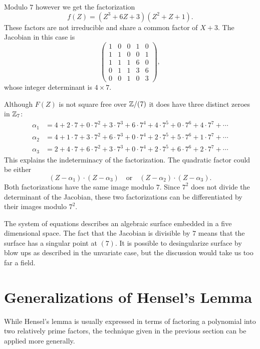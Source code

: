 {Modulo $7$ however we get the factorization
\[
f(Z) = (Z^3 + 6 Z + 3) (Z^2 +  Z + 1).
\]
These factors are not irreducible and share a common factor of
$X+3$.  The Jacobian in this case is 
\[
\left(
\begin{array}{ccccc}
1 & 0 & 0 & 1 & 0 \\
1 & 1 & 0 & 0 & 1 \\
1 & 1 & 1 & 6 & 0 \\
0 & 1 & 1 & 3 & 6 \\
0 & 0 & 1 & 0 & 3
\end{array}
\right),
\]
whose integer determinant is $4 \times 7$.

\label{PolyZ7:SQFR:Ex}
Although $F(Z)$ is not square free over $\mathbb{Z}/(7)$ it does have three
distinct zeroes in $\mathbb{Z}_7$:
\[
\begin{aligned}
\alpha_1 & = 4 + 2\cdot 7 + 0\cdot 7^2 + 3\cdot 7^3 + 6\cdot 7^4 +
4\cdot 7^5 + 0\cdot 7^6 + 4\cdot 7^7 + \cdots \\
\alpha_2 & = 4 + 1\cdot7 + 3\cdot7^2 + 6\cdot7^3 + 0\cdot7^4 + 2\cdot7^5
+ 5\cdot7^6 + 1\cdot7^7 + \cdots \\
\alpha_3 & = 2 + 4\cdot7 + 6\cdot7^2 + 3\cdot7^3 + 0\cdot7^4 +
2\cdot7^5 + 6\cdot7^6 + 2\cdot7^7 + \cdots
\end{aligned}
\]
This explains the indeterminacy of the factorization.  The quadratic
factor could be either
\[
(Z - \alpha_1) \cdot (Z - \alpha_3) \quad\mbox{or}\quad
(Z - \alpha_2) \cdot (Z - \alpha_3).
\]
Both factorizations have the same image modulo $7$.  Since $7^2$ does
not divide the determinant of the Jacobian, these two factorizations
can be differentiated by their images modulo $7^2$.

The system of equations  describes an
algebraic surface embedded in a five dimensional space.  The fact that
the Jacobian is divisible by $7$ means that the surface has a singular
point at $(7)$.  It is possible to desingularize surface by blow ups
as described in the unvariate case,  but the discussion would take us too far a field.


\section{Generalizations of Hensel's Lemma}
\label{General:Hensel:Sec}

While Hensel's lemma is usually expressed in terms of factoring a
polynomial into two relatively prime factors, the technique given in
the previous section can be applied more generally. 

}
